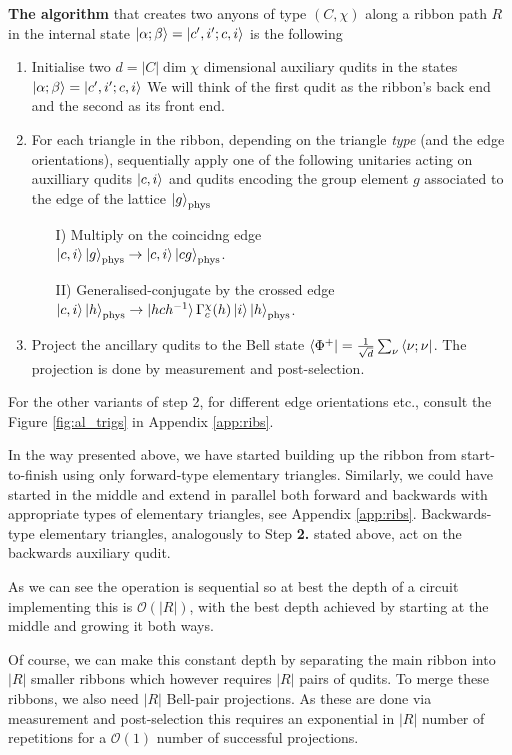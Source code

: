 \documentclass[two column]{article}
\begin{document}
\textbf{The algorithm} that creates two anyons of type $(C,\chi)$ along a ribbon path $R$ in the internal state $\ket{\alpha; \beta} = \ket{c', i'; c, i}$ is the following
\begin{enumerate}
    \item Initialise two $d=|C| \operatorname{dim} \chi$ dimensional auxiliary qudits in the states $\ket{\alpha; \beta} = \ket{c', i'; c, i}$  We will think of the first qudit as the ribbon's back end and the second as its front end.
    \item For each triangle in the ribbon, depending on the triangle \textit{type} (and the edge orientations), sequentially apply one of the following unitaries acting on auxilliary qudits $\ket{c, i}$ and qudits encoding the group element $g$ associated to the edge of the lattice $\ket{g}_\text{phys}$  
    \begin{itemize}
        \item[I)] Multiply on the coincidng edge\\  $\ket{c, i}\ket{g}_\text{phys} \rightarrow \ket{c, i}\ket{cg}_\text{phys}$.
       \item[II)] Generalised-conjugate by the crossed edge\\ $\ket{c,i}\ket{h}_\text{phys} \rightarrow \ket{hch^{-1}} \Gamma^\chi_c(h) \ket{i} \ket{h}_\text{phys}$.
    \end{itemize}
    \item Project the ancillary qudits to the Bell state $\bra{\Phi^+} = \frac{1}{\sqrt{d}}\sum_\nu \bra{\nu; \nu}$. The projection is done by measurement and post-selection.
\end{enumerate}
For the other variants of step 2, for different edge orientations etc., consult the Figure \ref{fig:al_trigs} in Appendix \ref{app:ribs}. 

In the way presented above, we have started building up the ribbon from start-to-finish using only forward-type elementary triangles. Similarly, we could have started in the middle and extend in parallel both forward and backwards with appropriate types of elementary triangles, see Appendix \ref{app:ribs}. Backwards-type elementary triangles, analogously to Step \textbf{2.} stated above, act on the backwards auxiliary qudit.

As we can see the operation is sequential so at best the depth of a circuit implementing this is $\mathcal{O}(|R|)$, with the best depth achieved by starting at the middle and growing it both ways.

Of course, we can make this constant depth by separating the main ribbon into $|R|$ smaller ribbons which however requires $|R|$ pairs of qudits. To merge these ribbons, we also need $|R|$ Bell-pair projections. As these are done via measurement and post-selection this requires an exponential in $|R|$ number of repetitions for a $\mathcal{O}(1)$ number of successful projections.
\end{document}
